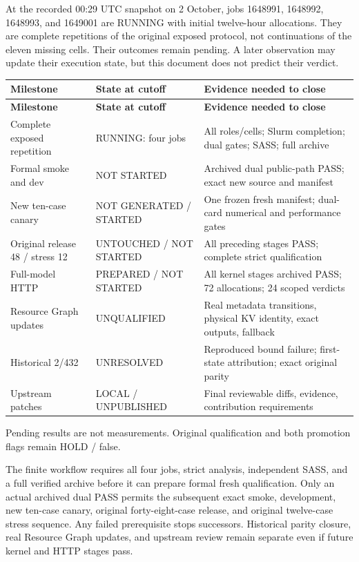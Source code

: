 \documentclass[11pt,a4paper]{article}
\begin{document}
At the recorded 00:29 UTC snapshot on 2 October, jobs 1648991, 1648992, 1648993, and 1649001 are RUNNING with initial twelve-hour allocations. They are complete repetitions of the original exposed protocol, not continuations of the eleven missing cells. Their outcomes remain pending. A later observation may update their execution state, but this document does not predict their verdict.


\begin{small}
\begin{longtable}{@{}p{4.0cm}p{3.5cm}p{7.0cm}@{}}
\toprule
\textbf{Milestone} & \textbf{State at cutoff} & \textbf{Evidence needed to close} \\
\midrule\endfirsthead
\toprule
\textbf{Milestone} & \textbf{State at cutoff} & \textbf{Evidence needed to close} \\
\midrule\endhead
Complete exposed repetition & RUNNING: four jobs & All roles/\allowbreak{}cells; Slurm completion; dual gates; SASS; full archive \\
Formal smoke and dev & NOT STARTED & Archived dual public-path PASS; exact new source and manifest \\
New ten-case canary & NOT GENERATED /\allowbreak{} STARTED & One frozen fresh manifest; dual-card numerical and performance gates \\
Original release 48 /\allowbreak{} stress 12 & UNTOUCHED /\allowbreak{} NOT STARTED & All preceding stages PASS; complete strict qualification \\
Full-model HTTP & PREPARED /\allowbreak{} NOT STARTED & All kernel stages archived PASS; 72 allocations; 24 scoped verdicts \\
Resource Graph updates & UNQUALIFIED & Real metadata transitions, physical KV identity, exact outputs, fallback \\
Historical 2/\allowbreak{}432 & UNRESOLVED & Reproduced bound failure; first-state attribution; exact original parity \\
Upstream patches & LOCAL /\allowbreak{} UNPUBLISHED & Final reviewable diffs, evidence, contribution requirements \\
\bottomrule
\end{longtable}
\end{small}
\noindent\small Pending results are not measurements. Original qualification and both promotion flags remain HOLD /\allowbreak{} false.\normalsize\par\medskip

The finite workflow requires all four jobs, strict analysis, independent SASS, and a full verified archive before it can prepare formal fresh qualification. Only an actual archived dual PASS permits the subsequent exact smoke, development, new ten-case canary, original forty-eight-case release, and original twelve-case stress sequence. Any failed prerequisite stops successors. Historical parity closure, real Resource Graph updates, and upstream review remain separate even if future kernel and HTTP stages pass.
\end{document}
